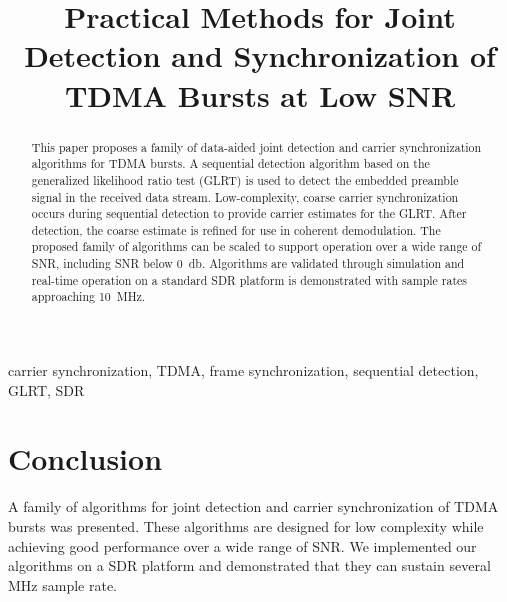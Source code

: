 \documentclass[10pt,final,conference,comsoc]{IEEEtran}
\begin{document}
\title{Practical Methods for Joint Detection and Synchronization of
  TDMA Bursts at Low SNR}
\author{
}

\maketitle

\begin{abstract}
This paper proposes a family of data-aided joint detection and carrier synchronization algorithms for 
TDMA bursts.
A sequential detection algorithm based on the generalized likelihood ratio test (GLRT)
is used to detect the embedded preamble signal in the received data
stream.
Low-complexity, coarse carrier synchronization 
occurs during sequential detection to provide carrier estimates for
the GLRT.\@
After detection,
the coarse estimate is refined for use in coherent demodulation.
The proposed family of algorithms can be scaled to support operation
over a wide range of SNR, including SNR below \SI{0}{\decibel}.
Algorithms are validated through simulation and real-time operation on
a standard SDR platform is demonstrated with sample rates approaching
\SI{10}{\mega\hertz}.

\end{abstract}

\begin{IEEEkeywords}
carrier synchronization, TDMA, frame synchronization, sequential
detection, GLRT, SDR
\end{IEEEkeywords}













\section{Conclusion}

A family of algorithms for joint detection and carrier synchronization
of TDMA bursts was presented.
These algorithms are designed for low complexity while achieving good
performance over a wide range of SNR.\@
We implemented our algorithms on a SDR platform and demonstrated that
they can sustain several \si{\mega\hertz} sample rate.



\end{document}
